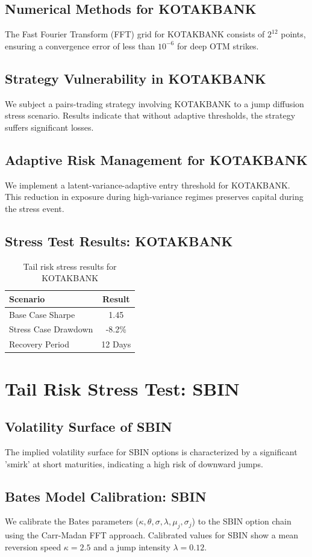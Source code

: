 \documentclass[12pt,a4paper,twoside]{article}
\begin{document}
\subsection{Numerical Methods for KOTAKBANK}
The Fast Fourier Transform (FFT) grid for KOTAKBANK consists of $2^{12}$ points, ensuring a convergence error of less than $10^{-6}$ for deep OTM strikes.
\subsection{Strategy Vulnerability in KOTAKBANK}
We subject a pairs-trading strategy involving KOTAKBANK to a jump diffusion stress scenario. Results indicate that without adaptive thresholds, the strategy suffers significant losses.
\subsection{Adaptive Risk Management for KOTAKBANK}
We implement a latent-variance-adaptive entry threshold for KOTAKBANK. This reduction in exposure during high-variance regimes preserves capital during the stress event.
\subsection{Stress Test Results: KOTAKBANK}
\begin{table}[H]
\centering
\begin{tabular}{|l|c|}
\hline
Scenario & Result \\
\hline
Base Case Sharpe & 1.45 \\
Stress Case Drawdown & -8.2\% \\
Recovery Period & 12 Days \\
\hline
\end{tabular}
\caption{Tail risk stress results for KOTAKBANK}
\end{table}
\newpage

\section{Tail Risk Stress Test: SBIN}
\subsection{Volatility Surface of SBIN}
The implied volatility surface for SBIN options is characterized by a significant 'smirk' at short maturities, indicating a high risk of downward jumps.
\subsection{Bates Model Calibration: SBIN}
We calibrate the Bates parameters ($\kappa, \theta, \sigma, \lambda, \mu_j, \sigma_j$) to the SBIN option chain using the Carr-Madan FFT approach.
Calibrated values for SBIN show a mean reversion speed $\kappa = 2.5$ and a jump intensity $\lambda = 0.12$.
\end{document}
